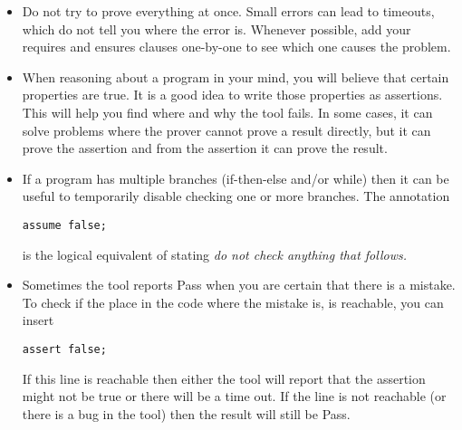 \begin{itemize}
\item Do not try to prove everything at once. Small errors can lead to timeouts,
which do not tell you where the error is. Whenever possible, add your
requires and ensures clauses one-by-one to see which one causes the problem.
\item When reasoning about a program in your mind, you will believe that
certain properties are true. It is a good idea to write those properties as assertions.
This will help you find where and why the tool fails. In some cases, it can solve
problems where the prover cannot prove a result directly, but it can prove the assertion
and from the assertion it can prove the result.
\item If a program has multiple branches (if-then-else and/or while) then it can be useful
to temporarily disable checking one or more branches. The annotation
\begin{verbatim}
assume false;
\end{verbatim}
is the logical equivalent of stating {\em do not check anything that follows.}
\item Sometimes the tool reports Pass when you are certain that there is a mistake.
To check if the place in the code where the mistake is, is reachable, you can insert
\begin{verbatim}
assert false;
\end{verbatim}
If this line is reachable then either the tool will report that the assertion might not be true
or there will be a time out. If the line is not reachable (or there is a bug in the tool)
then the result will still be Pass.
\end{itemize}

